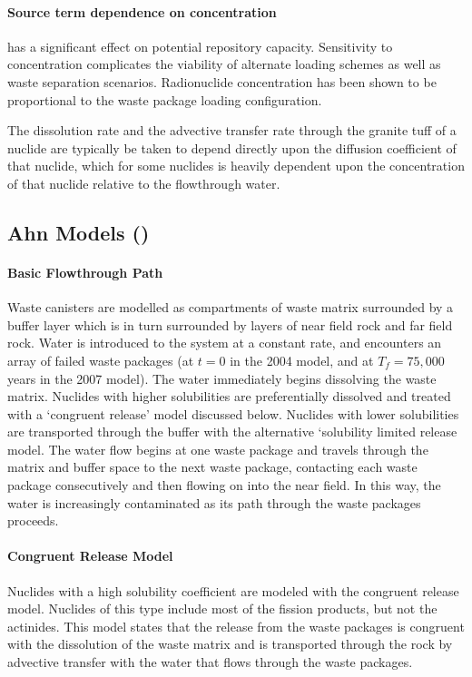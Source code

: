 \paragraph{Source term dependence on concentration} has a significant effect on potential repository capacity. Sensitivity to concentration complicates the viability of alternate loading schemes as well as waste separation scenarios. Radionuclide concentration has been shown to be proportional to the waste package loading configuration.\cite{ahn_relationship_2002,kawasaki_congruent_2004}

The dissolution rate and the advective transfer rate through the granite tuff of a nuclide are typically be taken to depend directly upon the diffusion coefficient of that nuclide, which for some nuclides is heavily dependent upon the concentration of that nuclide relative to the flowthrough water. 

\subsection{Ahn Models (\cite{ahn_environmental_2004, ahn_environmental_2007})}
\paragraph{Basic Flowthrough Path}
Waste canisters are modelled as compartments of waste matrix surrounded by a buffer layer which is in turn surrounded by layers of near field rock and far field rock. Water is introduced to the system at a constant rate, and encounters an array of failed waste packages (at $t=0$ in the 2004 model, and at $T_f=75,000$ years in the 2007 model). The water immediately begins dissolving the waste matrix. Nuclides with higher solubilities are preferentially dissolved and treated with a `congruent release' model discussed below. Nuclides with lower solubilities are transported through the buffer with the alternative `solubility limited release model. The water flow begins at one waste package and travels through the matrix and buffer space to the next waste package, contacting each waste package consecutively and then flowing on into the near field. In this way, the water is increasingly contaminated as its path through the waste packages proceeds.  
\paragraph{Congruent Release Model} 
Nuclides with a high solubility coefficient are modeled with the congruent release model. Nuclides of this type include most of the fission products, but not the actinides. This model states that the release from the waste packages is congruent with the dissolution of the waste matrix and is transported through the rock by advective transfer with the water that flows through the waste packages.  
